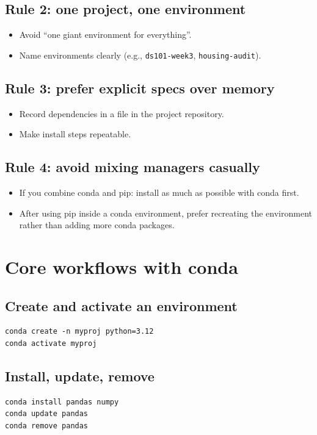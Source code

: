 \subsection{Rule 2: one project, one environment}
\begin{itemize}
\item Avoid ``one giant environment for everything''.
\item Name environments clearly (e.g., \texttt{ds101-week3}, \texttt{housing-audit}).
\end{itemize}

\subsection{Rule 3: prefer explicit specs over memory}
\begin{itemize}
\item Record dependencies in a file in the project repository.
\item Make install steps repeatable.
\end{itemize}

\subsection{Rule 4: avoid mixing managers casually}
\begin{itemize}
\item If you combine conda and pip: install as much as possible with conda first.
\item After using pip inside a conda environment, prefer recreating the environment rather than adding more conda packages.
\end{itemize}

\section{Core workflows with conda}
\subsection{Create and activate an environment}
\begin{verbatim}
conda create -n myproj python=3.12
conda activate myproj
\end{verbatim}

\subsection{Install, update, remove}
\begin{verbatim}
conda install pandas numpy
conda update pandas
conda remove pandas
\end{verbatim}

